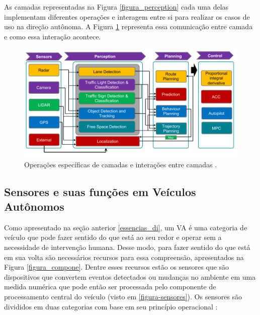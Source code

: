 As camadas representadas na Figura \ref{figura_perception} cada uma delas implementam diferentes operações e interagem entre si para realizar os casos de uso na direção autônoma. A Figura \ref{figura_camadas} representa essa comunicação entre camada e como essa interação acontece.

\begin{figure}[H]
\centering
\includegraphics[width=\textwidth]{Figures/layer-sens.png}
\caption{Operações específicas de camadas e interações entre camadas \cite{sensors-yet}.}
\label{figura_camadas}
\end{figure}



\subsection{Sensores e suas funções em Veículos Autônomos} \label{sensores-a}

Como apresentado na seção anterior \ref{essencias_di}, um VA é uma categoria de veículo que pode fazer sentido do que está ao seu redor e operar sem a necessidade de intervenção humana. Desse modo, para fazer sentido do que está em sua volta são necessários recursos para essa compreensão, apresentados na Figura \ref{figura_compone}. Dentre esses recursos estão os sensores que são dispositivos que convertem eventos detectados ou mudanças no ambiente em uma medida numérica que pode então ser processada pelo componente de processamento central do veículo (visto em \ref{figura-sensores}). 
Os sensores são divididos em duas categorias com base em seu princípio operacional \cite{sensors}:  

